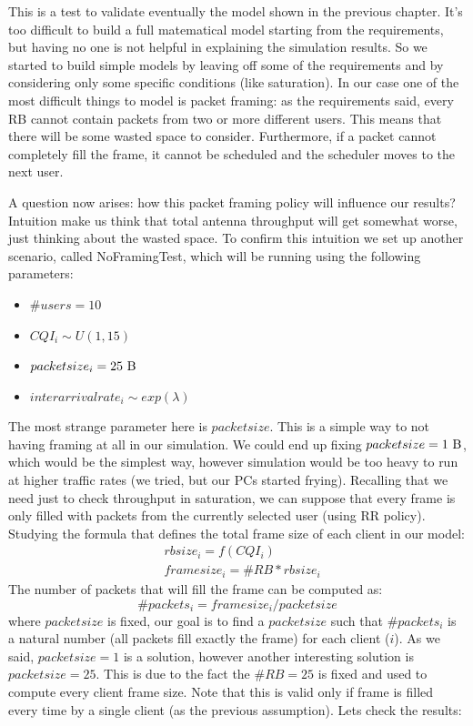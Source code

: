 This is a test to validate eventually the model shown in the previous chapter. It's too difficult to build a full matematical model starting from the requirements, but having no one is not helpful in explaining the simulation results. So we started to build simple models by leaving off some of the requirements and by considering only some specific conditions (like saturation). In our case one of the most difficult things to model is packet framing: as the requirements said, every RB cannot contain packets from two or more different users. This means that there will be some wasted space to consider. Furthermore, if a packet cannot completely fill the frame, it cannot be scheduled and the scheduler moves to the next user.

A question now arises: how this packet framing policy will influence our results? Intuition make us think that total antenna throughput will get somewhat worse, just thinking about the wasted space.
To confirm this intuition we set up another scenario, called NoFramingTest, which will be running using the following parameters:

\begin{itemize}
	\item \(\#users = 10\)
	\item \(CQI_i \sim U(1,15)\)
	\item \(packetsize_i=25 \textnormal{ B}\)
	\item \(interarrivalrate_i \sim exp(\lambda)\)
\end{itemize}

The most strange parameter here is \(packetsize\). This is a simple way to not having framing at all in our simulation. We could end up fixing \(packetsize=1 \textnormal{ B}\), which would be the simplest way, however simulation would be too heavy to run at higher traffic rates (we tried, but our PCs started frying). Recalling that we need just to check throughput in saturation, we can suppose that every frame is only filled with packets from the currently selected user (using RR policy).
Studying the formula that defines the total frame size of each client in our model:
\begin{equation}
	\begin{split}
	&rbsize_i = f(CQI_i) \\
	&framesize_i = \#RB*rbsize_i
	\end{split}
\end{equation}
The number of packets that will fill the frame can be computed as:
\begin{equation}
\#packets_i = framesize_i/packetsize
\end{equation}
where \(packetsize\) is fixed, our goal is to find a \(packetsize\) such that \(\#packets_i\) is a natural number (all packets fill exactly the frame) for each client (\(i\)).
As we said, \(packetsize=1\) is a solution, however another interesting solution is \(packetsize=25\). This is due to the fact the \(\#RB=25\) is fixed and used to compute every client frame size. Note that this is valid only if frame is filled every time by a single client (as the previous assumption). Lets check the results:


